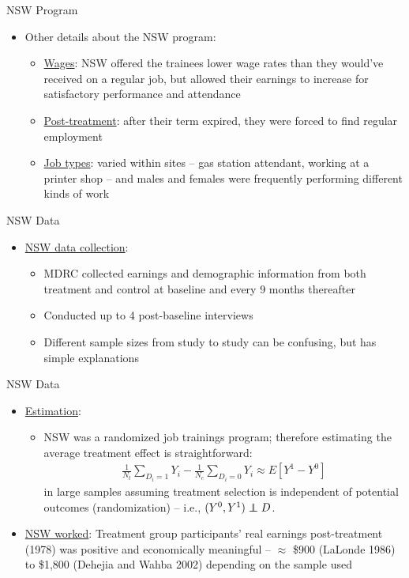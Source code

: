 \documentclass{beamer}
\newcommand\independent{\protect\mathpalette{\protect\independenT}{\perp}}
\def\independenT#1#2{\mathrel{\rlap{$#1#2$}\mkern2mu{#1#2}}}
\begin{document}
\begin{frame}{NSW Program}

\begin{itemize}
	\item Other details about the NSW program:
		\begin{itemize}
		\item \underline{Wages}:  NSW offered the trainees lower wage rates than they would've received on a regular job, but allowed their earnings to increase for satisfactory performance and attendance
		\item \underline{Post-treatment}: after their term expired, they were forced to find regular employment
		\item \underline{Job types}:  varied within sites -- gas station attendant, working at a printer shop -- and males and females were frequently performing different kinds of work
		\end{itemize}
\end{itemize}

\end{frame}
	
\begin{frame}{NSW Data}
	
	\begin{itemize}
	\item \underline{NSW data collection}:
		\begin{itemize}
		\item MDRC collected earnings and demographic information from both treatment and control at baseline and every 9 months thereafter
		\item Conducted up to 4 post-baseline interviews
		\item Different sample sizes from study to study can be confusing, but has simple explanations
		\end{itemize}
	\end{itemize}
\end{frame}
	

\begin{frame}{NSW Data}

\begin{itemize}
	\item \underline{Estimation}:
		\begin{itemize}
		\item NSW was a randomized job trainings program; therefore estimating the average treatment effect is straightforward:
			\begin{eqnarray*}
			\frac{1}{N_t}\sum_{D_i=1}Y_i - \frac{1}{N_c}\sum_{D_i=0}Y_i \approx E[Y^1-Y^0] 
			\end{eqnarray*}in large samples assuming treatment selection is independent of potential outcomes (randomization) -- i.e., $(Y^0,Y^1)\independent{D}$. 
		\end{itemize}
	\item \underline{NSW worked}: Treatment group participants' real earnings post-treatment (1978) was positive and economically meaningful -- $\approx$ \$900 (LaLonde 1986) to \$1,800 (Dehejia and Wahba 2002) depending on the sample used
\end{itemize}

\end{frame}
	
\end{document}
